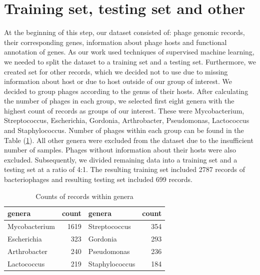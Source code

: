 \section{Training set, testing set and other}
At the beginning of this step, our dataset consisted of: phage genomic records, their corresponding genes, information about phage hosts and functional annotation of genes.
As our work used techniques of supervised machine learning, we needed to split the dataset to a training set and a testing set.
Furthermore, we created set for other records, which we decided not to use due to missing information about host or due to host outside of our group of interest.
We decided to group phages according to the genus of their hosts.
After calculating the number of phages in each group, we selected first eight genera with the highest count of records as groups of our interest.
These were Mycobacterium, Streptococcus, Escherichia, Gordonia, Arthrobacter, Pseudomonas, Lactococcus and Staphylococcus.
Number of phages within each group can be found in the Table (\ref{tab:counts}).
All other genera were excluded from the dataset due to the insufficient number of samples.
Phages without information about their hosts were also excluded.
Subsequently, we divided remaining data into a training set and a testing set at a ratio of 4:1.
The resulting training set included 2787 records of bacteriophages and resulting testing set included 699 records.

\begin{table}
  \centering
	\begin{tabular}{ l  r  l  r }
  	\hline
  	genera & count & genera & count \\
  	\hline
  	Mycobacterium & 1619 & Streptococcus & 354 \\
  	Escherichia & 323 & Gordonia & 293 \\
  	Arthrobacter & 240 & Pseudomonas & 236 \\
  	Lactococcus & 219 & Staphylococcus & 184 \\
  	\hline
	\end{tabular}
	\caption{Counts of records within genera}
	\label{tab:counts}
\end{table}





